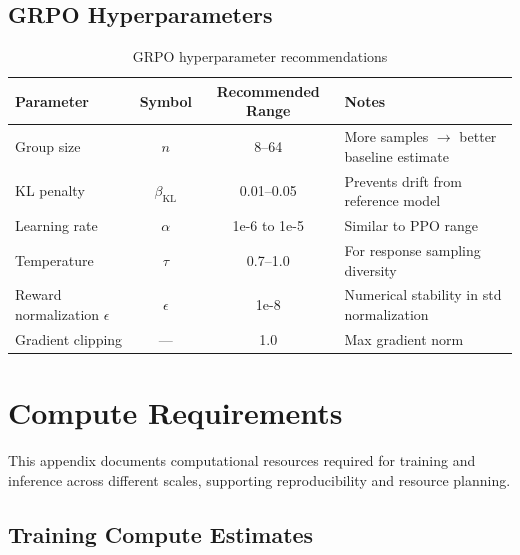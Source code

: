 \documentclass[12pt,a4paper]{report}
\theoremstyle{definition}
\begin{document}
\section{GRPO Hyperparameters}

\begin{table}[htbp]
\centering
\caption{GRPO hyperparameter recommendations}
\label{tab:grpo_hyperparams}
\begin{tabular}{@{}lccl@{}}
\toprule
\textbf{Parameter} & \textbf{Symbol} & \textbf{Recommended Range} & \textbf{Notes} \\
\midrule
Group size & $n$ & 8--64 & More samples $\rightarrow$ better baseline estimate \\
KL penalty & $\beta_{\text{KL}}$ & 0.01--0.05 & Prevents drift from reference model \\
Learning rate & $\alpha$ & 1e-6 to 1e-5 & Similar to PPO range \\
Temperature & $\tau$ & 0.7--1.0 & For response sampling diversity \\
Reward normalization $\epsilon$ & $\epsilon$ & 1e-8 & Numerical stability in std normalization \\
Gradient clipping & --- & 1.0 & Max gradient norm \\
\bottomrule
\end{tabular}
\end{table}

\chapter{Compute Requirements}
\label{app:compute}

This appendix documents computational resources required for training and inference across different scales, supporting reproducibility and resource planning.

\section*{Training Compute Estimates}
\end{document}
